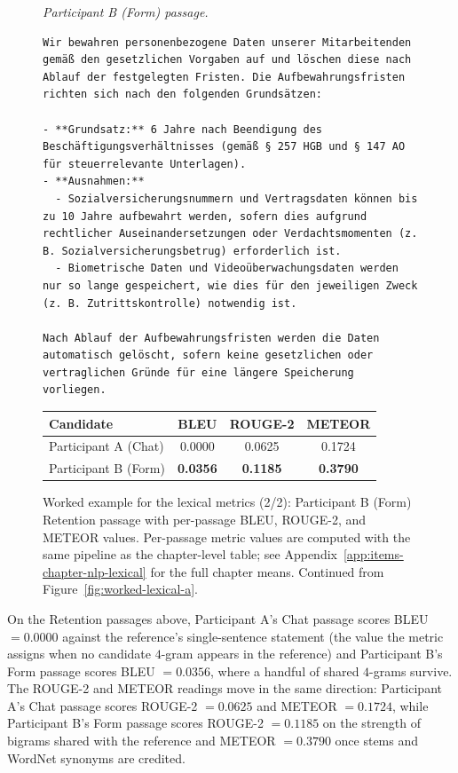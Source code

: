 \begin{figure}[!htbp]
\centering
\noindent\textit{Participant B (Form) passage.}
\begin{lstlisting}
Wir bewahren personenbezogene Daten unserer Mitarbeitenden gemäß den gesetzlichen Vorgaben auf und löschen diese nach Ablauf der festgelegten Fristen. Die Aufbewahrungsfristen richten sich nach den folgenden Grundsätzen:

- **Grundsatz:** 6 Jahre nach Beendigung des Beschäftigungsverhältnisses (gemäß § 257 HGB und § 147 AO für steuerrelevante Unterlagen).
- **Ausnahmen:**
  - Sozialversicherungsnummern und Vertragsdaten können bis zu 10 Jahre aufbewahrt werden, sofern dies aufgrund rechtlicher Auseinandersetzungen oder Verdachtsmomenten (z. B. Sozialversicherungsbetrug) erforderlich ist.
  - Biometrische Daten und Videoüberwachungsdaten werden nur so lange gespeichert, wie dies für den jeweiligen Zweck (z. B. Zutrittskontrolle) notwendig ist.

Nach Ablauf der Aufbewahrungsfristen werden die Daten automatisch gelöscht, sofern keine gesetzlichen oder vertraglichen Gründe für eine längere Speicherung vorliegen.
\end{lstlisting}

\vspace{0.5ex}
\begin{tabular}{@{}l c c c@{}}
\toprule
Candidate    & BLEU   & ROUGE-2 & METEOR \\
\midrule
Participant A (Chat) & 0.0000 & 0.0625  & 0.1724 \\
Participant B (Form) & \textbf{0.0356} & \textbf{0.1185}  & \textbf{0.3790} \\
\bottomrule
\end{tabular}
\caption{Worked example for the lexical metrics (2/2):
Participant B (Form) Retention passage with per-passage BLEU, ROUGE-2,
and METEOR values. Per-passage metric values are computed with
the same pipeline as the chapter-level table; see
Appendix~\ref{app:items-chapter-nlp-lexical} for the full chapter
means. Continued from Figure~\ref{fig:worked-lexical-a}.}
\label{fig:worked-lexical-b}
\end{figure}
\endgroup

On the Retention passages above, Participant A's Chat passage
scores BLEU $= 0.0000$ against the reference's single-sentence
statement (the value the metric assigns when no candidate
$4$-gram appears in the reference) and Participant B's Form
passage scores BLEU $= 0.0356$, where a handful of shared
$4$-grams survive. The ROUGE-2 and METEOR readings move in the
same direction: Participant A's Chat passage scores ROUGE-2
$= 0.0625$ and METEOR $= 0.1724$, while Participant B's Form
passage scores ROUGE-2 $= 0.1185$ on the strength of bigrams
shared with the reference and METEOR $= 0.3790$ once stems and
WordNet synonyms are credited.

